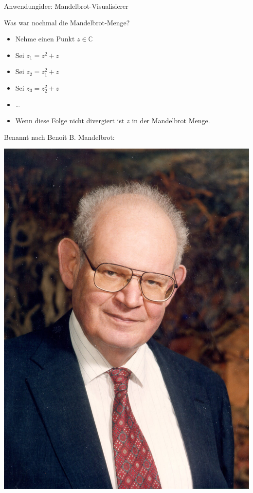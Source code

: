 \documentclass{beamer}
\begin{document}
\begin{frame}

Anwendungidee: Mandelbrot-Visualisierer\pause\bigskip

Was war nochmal die Mandelbrot-Menge?
\begin{multicols}{2}

\begin{itemize}
\item Nehme einen Punkt $z \in \mathbb{C}$\pause
\item Sei $z_1 = z^2 + z$\pause
\item Sei $z_2 = z_1^2 + z$\pause
\item Sei $z_3 = z_2^2 + z$
\item \dots\pause
\item Wenn diese Folge nicht divergiert ist $z$ in der Mandelbrot Menge.
\end{itemize}

\columnbreak
\pause

Benannt nach Benoit B. Mandelbrot:

\includegraphics[scale=0.15]{profile.png} 

\end{multicols}

\end{frame}
\end{document}
